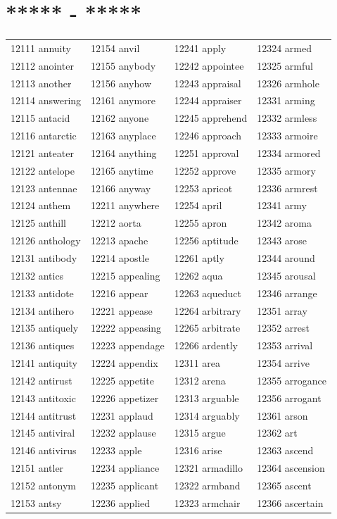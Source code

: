\documentclass[10pt, oneside]{book}
\begin{document}
\begin{table}
	\centering
	\section*{***** - *****}
	\begin{tabular}{l l l l}
12111 annuity &12154 anvil &12241 apply &12324 armed\\
12112 anointer &12155 anybody &12242 appointee &12325 armful\\
12113 another &12156 anyhow &12243 appraisal &12326 armhole\\
12114 answering &12161 anymore &12244 appraiser &12331 arming\\
12115 antacid &12162 anyone &12245 apprehend &12332 armless\\
12116 antarctic &12163 anyplace &12246 approach &12333 armoire\\
12121 anteater &12164 anything &12251 approval &12334 armored\\
12122 antelope &12165 anytime &12252 approve &12335 armory\\
12123 antennae &12166 anyway &12253 apricot &12336 armrest\\
12124 anthem &12211 anywhere &12254 april &12341 army\\
12125 anthill &12212 aorta &12255 apron &12342 aroma\\
12126 anthology &12213 apache &12256 aptitude &12343 arose\\
12131 antibody &12214 apostle &12261 aptly &12344 around\\
12132 antics &12215 appealing &12262 aqua &12345 arousal\\
12133 antidote &12216 appear &12263 aqueduct &12346 arrange\\
12134 antihero &12221 appease &12264 arbitrary &12351 array\\
12135 antiquely &12222 appeasing &12265 arbitrate &12352 arrest\\
12136 antiques &12223 appendage &12266 ardently &12353 arrival\\
12141 antiquity &12224 appendix &12311 area &12354 arrive\\
12142 antirust &12225 appetite &12312 arena &12355 arrogance\\
12143 antitoxic &12226 appetizer &12313 arguable &12356 arrogant\\
12144 antitrust &12231 applaud &12314 arguably &12361 arson\\
12145 antiviral &12232 applause &12315 argue &12362 art\\
12146 antivirus &12233 apple &12316 arise &12363 ascend\\
12151 antler &12234 appliance &12321 armadillo &12364 ascension\\
12152 antonym &12235 applicant &12322 armband &12365 ascent\\
12153 antsy &12236 applied &12323 armchair &12366 ascertain\\
	\end{tabular}
 \end{table}
\end{document}
